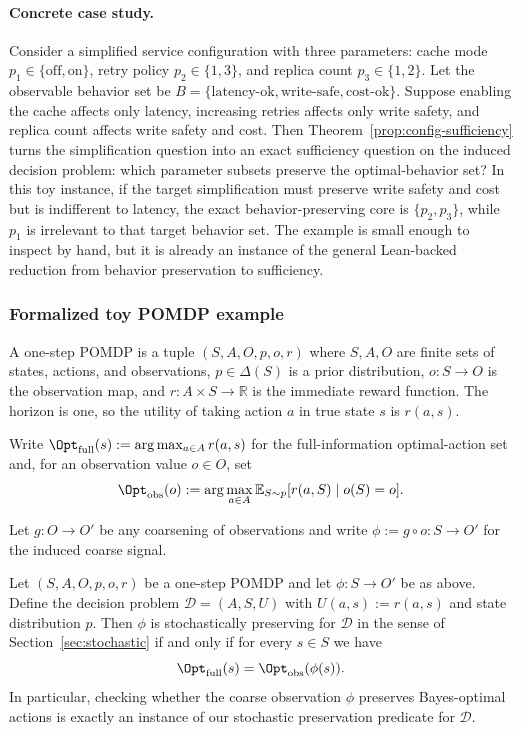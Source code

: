 \paragraph{Concrete case study.}
Consider a simplified service configuration with three parameters: cache mode $p_1\in\{\mathrm{off},\mathrm{on}\}$, retry policy $p_2\in\{1,3\}$, and replica count $p_3\in\{1,2\}$. Let the observable behavior set be $B=\{\mathrm{latency\text{-}ok},\mathrm{write\text{-}safe},\mathrm{cost\text{-}ok}\}$. Suppose enabling the cache affects only latency, increasing retries affects only write safety, and replica count affects write safety and cost. Then Theorem~\ref{prop:config-sufficiency} turns the simplification question into an exact sufficiency question on the induced decision problem: which parameter subsets preserve the optimal-behavior set? In this toy instance, if the target simplification must preserve write safety and cost but is indifferent to latency, the exact behavior-preserving core is $\{p_2,p_3\}$, while $p_1$ is irrelevant to that target behavior set. The example is small enough to inspect by hand, but it is already an instance of the general Lean-backed reduction from behavior preservation to sufficiency. 

\subsubsection{Formalized toy POMDP example}

\begin{definition}\label{def:one-step-pomdp}
A one-step POMDP is a tuple $(S,A,O,p,o,r)$ where $S,A,O$ are finite sets of states, actions, and observations, $p\in\Delta(S)$ is a prior distribution, $o:S\to O$ is the observation map, and $r:A\times S\to\mathbb{R}$ is the immediate reward function. The horizon is one, so the utility of taking action $a$ in true state $s$ is $r(a,s)$.
\end{definition}

Write $\Opt_{\mathrm{full}}(s):=\arg\max_{a\in A} r(a,s)$ for the full-information optimal-action set and, for an observation value $o\in O$, set
\[
\Opt_{\mathrm{obs}}(o):=\arg\max_{a\in A} \mathbb{E}_{S\sim p}[r(a,S)\mid o(S)=o].
\]

Let $g:O\to O'$ be any coarsening of observations and write $\phi:=g\circ o:S\to O'$ for the induced coarse signal.

\begin{proposition}\label{prop:pomdp-to-preservation}
Let $(S,A,O,p,o,r)$ be a one-step POMDP and let $\phi:S\to O'$ be as above. Define the decision problem $\mathcal{D}=(A,S,U)$ with $U(a,s):=r(a,s)$ and state distribution $p$. Then $\phi$ is stochastically preserving for $\mathcal{D}$ in the sense of Section~\ref{sec:stochastic} if and only if for every $s\in S$ we have
\[
\Opt_{\mathrm{full}}(s)=\Opt_{\mathrm{obs}}(\phi(s)).
\]
In particular, checking whether the coarse observation $\phi$ preserves Bayes-optimal actions is exactly an instance of our stochastic preservation predicate for $\mathcal{D}$.
\end{proposition}


